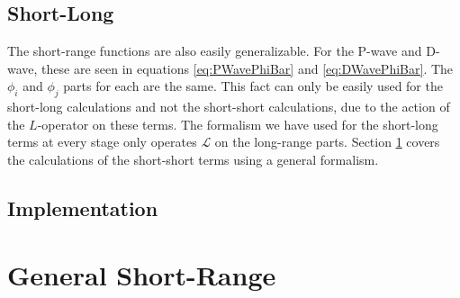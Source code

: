 \documentclass[Dissertation.tex]{subfiles}
\begin{document}


\subsection{Short-Long}
\label{sec:GeneralShortLong}
The short-range functions are also easily generalizable. For the P-wave and D-wave, these are seen in equations \ref{eq:PWavePhiBar} and \ref{eq:DWavePhiBar}. The $\phi_i$ and $\phi_j$ parts for each are the same. This fact can only be easily used for the short-long calculations and not the short-short calculations, due to the action of the $L$-operator on these terms. The formalism we have used for the short-long terms at every stage only operates $\mathcal{L}$ on the long-range parts. Section \ref{sec:GeneralShort} covers the calculations of the short-short terms using a general formalism.

\subsection{Implementation}
\label{sec:GeneralLongImp}



\section{General Short-Range}
\label{sec:GeneralShort}

\end{document}
